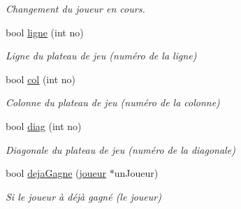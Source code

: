 \begin{DoxyCompactItemize}
\begin{DoxyCompactList}\small\item\em Changement du joueur en cours. \end{DoxyCompactList}\item 
bool \hyperlink{class_main_window_a6dc1f84d9bc6e8ab7f1bb6bc04e2db49}{ligne} (int no)
\begin{DoxyCompactList}\small\item\em Ligne du plateau de jeu (numéro de la ligne) \end{DoxyCompactList}\item 
bool \hyperlink{class_main_window_a85653198b42750c0f09876f0af3715d7}{col} (int no)
\begin{DoxyCompactList}\small\item\em Colonne du plateau de jeu (numéro de la colonne) \end{DoxyCompactList}\item 
bool \hyperlink{class_main_window_a7b80bba7c56fbcc016dbc004d208ec31}{diag} (int no)
\begin{DoxyCompactList}\small\item\em Diagonale du plateau de jeu (numéro de la diagonale) \end{DoxyCompactList}\item 
bool \hyperlink{class_main_window_a1810f8a7d5a8497d738d909efca8947b}{deja\-Gagne} (\hyperlink{classjoueur}{joueur} $\ast$un\-Joueur)
\begin{DoxyCompactList}\small\item\em Si le joueur à déjà gagné (le joueur) \end{DoxyCompactList}\end{DoxyCompactItemize}
